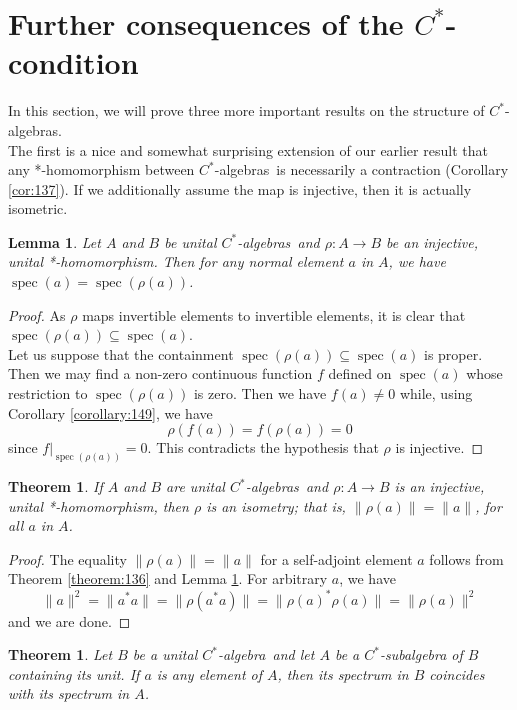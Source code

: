 \documentclass{book}
\newtheorem{lemma}[definition]{Lemma}
\newtheorem{theorem}[definition]{Theorem}
\def\cstar{\(C^*\)-algebra}
\def\cstars{\(C^*\)-algebras}
\begin{document}
\section{Further consequences of the \texorpdfstring{\(C^*\)}{C*}-condition}
In this section, we will prove three more important results on the structure
of \cstars.\\
The first is a nice and somewhat surprising extension of our earlier result
that any *-homomorphism between \cstars\ is necessarily a contraction
(Corollary \ref{cor:137}). If we additionally assume the map is injective, then it is
actually isometric.
\begin{lemma}\label{lemma:151}
  Let \(A\) and \(B\) be unital \cstars\ and \(\rho: A \rightarrow B\) be an
  injective, unital *-homomorphism. Then for any normal element \(a\) in \(A\), we
  have \(\operatorname{spec}(a) = \operatorname{spec}(\rho(a))\).
\end{lemma}
\begin{proof}
  As \(\rho\) maps invertible elements to invertible elements, it is clear that
  \(\operatorname{spec}(\rho(a)) \subseteq \operatorname{spec}(a)\).\\
  Let us suppose that the containment \(\operatorname{spec}(\rho(a)) \subseteq \operatorname{spec}(a)\) is proper.
  Then we may find a non-zero continuous function \(f\) defined on \(\operatorname{spec}(a)\) whose
  restriction to \(\operatorname{spec}(\rho(a))\) is zero. Then we have \(f(a)\neq 0\) while, using Corollary \ref{corollary:149}, we have
  \[
    \rho(f(a)) = f(\rho(a)) = 0
  \]
  since \(f|_{\operatorname{spec}(\rho(a))} = 0\). This contradicts the hypothesis that \(\rho\) is injective.
\end{proof}
\begin{theorem}\label{theorem:152}
  If \(A\) and \(B\) are unital \cstars\ and \(\rho : A \rightarrow B\) is an
  injective, unital *-homomorphism, then \(\rho\) is an isometry; that is, \(\|\rho(a)\| = \|a\|\), for
  all \(a\) in \(A\).
\end{theorem}
\begin{proof}
  The equality \(\|\rho(a)\| = \|a\|\) for a self-adjoint element \(a\) follows from
  Theorem \ref{theorem:136} and Lemma \ref{lemma:151}. For arbitrary \(a\), we have
  \[
    \|a\|^2 = \|a^*a\| = \|\rho(a^*a)\| = \|{\rho(a)}^*\rho(a)\| = \|\rho(a)\|^2
  \]
  and we are done.
\end{proof}
\begin{theorem}\label{theorem:153}
  Let \(B\) be a unital \cstar\ and let \(A\) be a \(C^*\)-subalgebra
  of \(B\) containing its unit. If \(a\) is any element of \(A\), then its spectrum in \(B\)
  coincides with its spectrum in \(A\).
\end{theorem}
\end{document}
